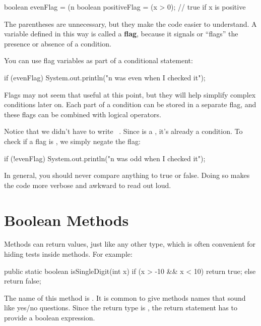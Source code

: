 \begin{code}
boolean evenFlag = (n %
boolean positiveFlag = (x > 0);     // true if x is positive
\end{code}


The parentheses are unnecessary, but they make the code easier to understand.
A variable defined in this way is called a {\bf flag}, because it signals or ``flags'' the presence or absence of a condition.

You can use flag variables as part of a conditional statement:

\begin{code}
if (evenFlag) {
    System.out.println("n was even when I checked it");
}
\end{code}

Flags may not seem that useful at this point, but they will help simplify complex conditions later on.
Each part of a condition can be stored in a separate flag, and these flags can be combined with logical operators.

Notice that we didn't have to write ~.
Since  is a , it's already a condition.
To check if a flag is , we simply negate the flag:

\begin{code}
if (!evenFlag) {
    System.out.println("n was odd when I checked it");
}
\end{code}

In general, you should never compare anything to true or false.
Doing so makes the code more verbose and awkward to read out loud.


\section{Boolean Methods}
\label{boolmeth}


Methods can return  values, just like any other type, which is often convenient for hiding tests inside methods.
For example:

\begin{code}
public static boolean isSingleDigit(int x) {
    if (x > -10 && x < 10) {
        return true;
    } else {
        return false;
    }
}
\end{code}

The name of this method is .
It is common to give  methods names that sound like yes/no questions.
Since the return type is , the return statement has to provide a boolean expression.

